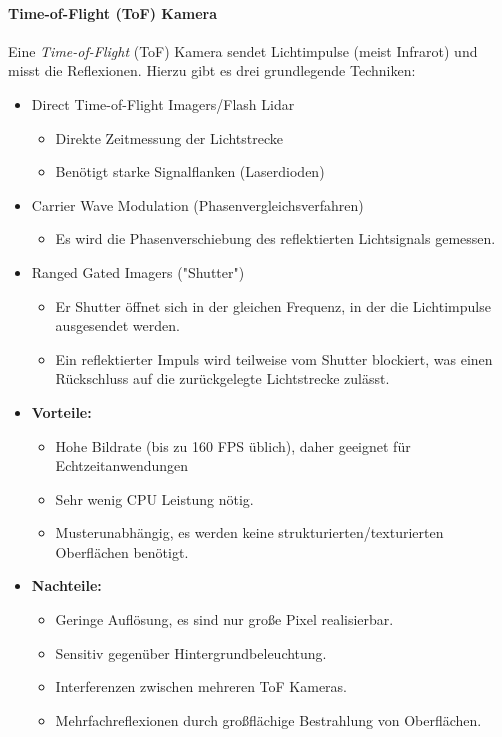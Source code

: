 				\paragraph{Time-of-Flight (ToF) Kamera}
					Eine \emph{Time-of-Flight} (ToF) Kamera sendet Lichtimpulse (meist Infrarot) und misst die Reflexionen. Hierzu gibt es drei grundlegende Techniken:
					\begin{itemize}
						\item Direct Time-of-Flight Imagers/Flash Lidar
							\begin{itemize}
								\item Direkte Zeitmessung der Lichtstrecke
								\item Benötigt starke Signalflanken (\zB Laserdioden)
							\end{itemize}
						\item Carrier Wave Modulation (Phasenvergleichsverfahren)
							\begin{itemize}
								\item Es wird die Phasenverschiebung des reflektierten Lichtsignals gemessen.
							\end{itemize}
						\item Ranged Gated Imagers ("Shutter")
							\begin{itemize}
								\item Er Shutter öffnet sich in der gleichen Frequenz, in der die Lichtimpulse ausgesendet werden.
								\item Ein reflektierter Impuls wird teilweise vom Shutter blockiert, was einen Rückschluss auf die zurückgelegte Lichtstrecke zulässt.
							\end{itemize}
					\end{itemize}
				
					\begin{itemize}
						\item \textbf{Vorteile:}
							\begin{itemize}
								\item Hohe Bildrate (bis zu \num{160} FPS üblich), daher geeignet für Echtzeitanwendungen
								\item Sehr wenig CPU Leistung nötig.
								\item Musterunabhängig, \dh es werden keine strukturierten/texturierten Oberflächen benötigt.
							\end{itemize}
						\item \textbf{Nachteile:}
							\begin{itemize}
								\item Geringe Auflösung, es sind nur große Pixel realisierbar.
								\item Sensitiv gegenüber Hintergrundbeleuchtung.
								\item Interferenzen zwischen mehreren ToF Kameras.
								\item Mehrfachreflexionen durch großflächige Bestrahlung von Oberflächen.
							\end{itemize}
					\end{itemize}

